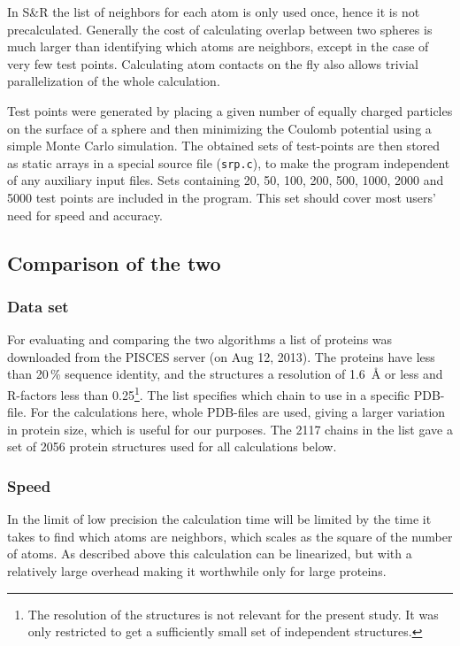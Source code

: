 \documentclass[a4paper,11pt]{article}
\begin{document}
In S\&R the list of neighbors for each atom is only used once, hence
it is not precalculated. Generally the cost of calculating overlap
between two spheres is much larger than identifying which atoms are
neighbors, except in the case of very few test points. Calculating
atom contacts on the fly also allows trivial parallelization of the
whole calculation.

Test points were generated by placing a given number of equally
charged particles on the surface of a sphere and then minimizing the
Coulomb potential using a simple Monte Carlo simulation. The obtained
sets of test-points are then stored as static arrays in a special
source file (\texttt{srp.c}), to make the program independent of any
auxiliary input files. Sets containing 20, 50, 100, 200, 500, 1000,
2000 and 5000 test points are included in the program. This set should
cover most users' need for speed and accuracy.

\subsection{Comparison of the two}\label{sec:compare}

\subsubsection{Data set}\label{sec:dataset}

For evaluating and comparing the two algorithms a list of proteins was
downloaded from the PISCES server (on Aug 12, 2013). The proteins have
less than 20\,\% sequence identity, and the structures a resolution of
1.6~Å or less and R-factors less than 0.25\footnote{The resolution of
  the structures is not relevant for the present study. It was only
  restricted to get a sufficiently small set of independent
  structures.}. The list specifies which chain to use in a specific
PDB-file. For the calculations here, whole PDB-files are used, giving
a larger variation in protein size, which is useful for our
purposes. The 2117 chains in the list gave a set of 2056 protein
structures used for all calculations below.

\subsubsection{Speed}

In the limit of low precision the calculation time will be limited by
the time it takes to find which atoms are neighbors, which scales as
the square of the number of atoms. As described above this calculation
can be linearized, but with a relatively large overhead making it
worthwhile only for large proteins.
\end{document}

